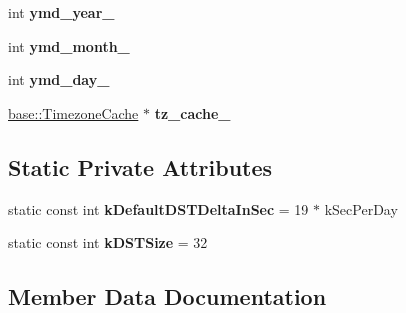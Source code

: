 \begin{DoxyCompactItemize}
\item 
int {\bfseries ymd\+\_\+year\+\_\+}\hypertarget{classv8_1_1internal_1_1_date_cache_aba09df3721884bea1a667996b4dcbc0a}{}\label{classv8_1_1internal_1_1_date_cache_aba09df3721884bea1a667996b4dcbc0a}

\item 
int {\bfseries ymd\+\_\+month\+\_\+}\hypertarget{classv8_1_1internal_1_1_date_cache_a216b99afbcb947306f939a1b259bf738}{}\label{classv8_1_1internal_1_1_date_cache_a216b99afbcb947306f939a1b259bf738}

\item 
int {\bfseries ymd\+\_\+day\+\_\+}\hypertarget{classv8_1_1internal_1_1_date_cache_a3d225192f51b690d8e1346cd6774b225}{}\label{classv8_1_1internal_1_1_date_cache_a3d225192f51b690d8e1346cd6774b225}

\item 
\hyperlink{classv8_1_1base_1_1_timezone_cache}{base\+::\+Timezone\+Cache} $\ast$ {\bfseries tz\+\_\+cache\+\_\+}\hypertarget{classv8_1_1internal_1_1_date_cache_a89019ad0b3973df5f3786746461badbe}{}\label{classv8_1_1internal_1_1_date_cache_a89019ad0b3973df5f3786746461badbe}

\end{DoxyCompactItemize}
\subsection*{Static Private Attributes}
\begin{DoxyCompactItemize}
\item 
static const int {\bfseries k\+Default\+D\+S\+T\+Delta\+In\+Sec} = 19 $\ast$ k\+Sec\+Per\+Day\hypertarget{classv8_1_1internal_1_1_date_cache_a866e25f42554780aa7af6147d401c963}{}\label{classv8_1_1internal_1_1_date_cache_a866e25f42554780aa7af6147d401c963}

\item 
static const int {\bfseries k\+D\+S\+T\+Size} = 32\hypertarget{classv8_1_1internal_1_1_date_cache_abf280a69446bdb0738c06f48ad0286f1}{}\label{classv8_1_1internal_1_1_date_cache_abf280a69446bdb0738c06f48ad0286f1}

\end{DoxyCompactItemize}


\subsection{Member Data Documentation}
